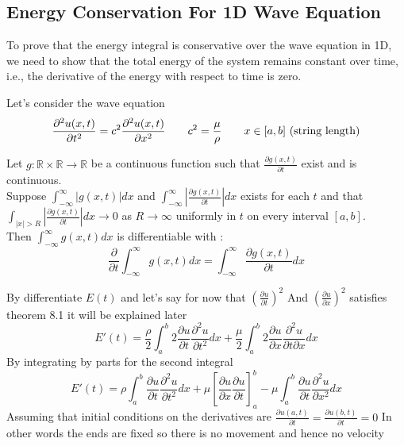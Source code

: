 \subsection{Energy Conservation For 1D Wave Equation}
To prove that the energy integral is conservative over the wave equation in 1D,
we need to show that the total energy of the system remains constant over time, i.e., the derivative of the energy with respect to time is zero.
\par
Let's consider the wave equation
\[
    \frac{\partial^2 u(x,t)}{\partial t^2} = c^2 \frac{\partial^2 u(x,t)}{\partial x^2} \quad\quad c^2 = \frac{\mu}{\rho} \quad\quad x \in [a,b] \text{ (string length)}
\]
\vspace*{-.2cm}
\begin{theorem}
    Let $g : \mathbb{R}\times\mathbb{R} \to \mathbb{R}$ be a continuous function such that $\displaystyle \frac{\partial g(x,t)}{\partial t}$ exist and is continuous.
    \\
    Suppose $\displaystyle \int_{-\infty}^{\infty} |g(x,t)| dx $  and   $\displaystyle \int_{-\infty}^{\infty} |\frac{\partial g(x,t)}{\partial t}| dx $ exists for each $t$
    and that $\displaystyle \int_{|x|>R} |\frac{\partial g(x,t)}{\partial t}| dx \to 0 $ as $R \to \infty$ uniformly in $t$ on every interval $[a,b]$.\
    \\
    Then $\displaystyle \int_{-\infty}^{\infty} g(x,t) dx $ is differentiable with :
    \[
        \frac{\partial}{\partial t} \int_{-\infty}^{\infty} g(x,t) dx = \int_{-\infty}^{\infty} \frac{\partial g(x,t)}{\partial t} dx
    \]
\end{theorem}
By differentiate $E(t)$ and let's say for now that 
$\displaystyle {\left(\frac{\partial u}{\partial t}\right)}^2$
And
$\displaystyle {\left(\frac{\partial u}{\partial x}\right)}^2$
satisfies theorem 8.1 it will be explained later 
\[
E'(t) = \frac{\rho}{2} \int_{a}^{b} 2\frac{\partial u}{\partial t}\frac{\partial^2 u}{\partial t^2} dx + \frac{\mu}{2} \int_{a}^{b} 2\frac{\partial u}{\partial x}\frac{\partial^2 u}{\partial t\partial x} dx    
\]
By integrating by parts for the second integral 
\[
E'(t) = \rho \int_{a}^{b} \frac{\partial u}{\partial t}\frac{\partial^2 u}{\partial t^2} dx +\mu\left[\frac{\partial u}{\partial x}\frac{\partial u}{\partial t}\right]_{a}^{b} -\mu \int_{a}^{b} \frac{\partial u}{\partial t}\frac{\partial^2 u}{\partial x^2} dx    
\]
Assuming that initial conditions on the derivatives are
$\displaystyle \frac{\partial u(a,t)}{\partial t} = \frac{\partial u(b,t)}{\partial t} = 0$
In other words the ends are fixed so there is no movement and hence no velocity
